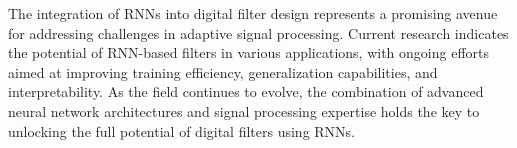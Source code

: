 The integration of RNNs into digital filter design represents a promising avenue for addressing challenges in adaptive signal processing. Current research indicates the potential of RNN-based filters in various applications, with ongoing efforts aimed at improving training efficiency, generalization capabilities, and interpretability. As the field continues to evolve, the combination of advanced neural network architectures and signal processing expertise holds the key to unlocking the full potential of digital filters using RNNs.
\vspace{1\baselineskip}
